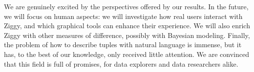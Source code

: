 We are genuinely excited by the perspectives offered by our results. In the
future, we will focus on human aspects: we will investigate how real users
interact with Ziggy, and which graphical tools can enhance their experience.
We will also enrich Ziggy with other measures of
difference, possibly with Bayesian modeling. Finally, the problem of how
to describe tuples with natural language is immense, but it has, to the best of
our knowledge, only received little attention. We are convinced that this field
is full of promises, for data explorers and data researchers alike.


%
%



